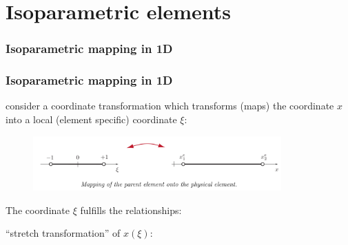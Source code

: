 \documentclass[notes]{beamer}
\begin{document}
\section{Isoparametric elements}
\begin{frame}
\frametitle{Isoparametric mapping in 1D}
\end{frame}

\begin{frame}
\frametitle{Isoparametric mapping in 1D}
consider a coordinate transformation which transforms (maps) the coordinate $x$ into a local (element specific) coordinate $\xi$:	
\begin{figure}[ht]
	\centering
	\includegraphics[width=0.85\textwidth]{figs/1d-isoparametric-shapefn.png}
\end{figure}
The coordinate $\xi$ fulfills the relationships:


``stretch transformation'' of $x(\xi)$: 

\end{frame}
\end{document}
